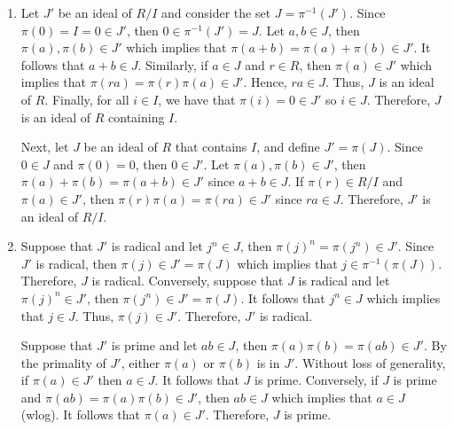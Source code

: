 \begin{solution}
    \begin{enumerate}[label=(\alph*)]
        \item Let $J'$ be an ideal of $R/I$ and consider the set $J = \pi^{-1}(J')$. Since $\pi(0) = I = 0 \in J'$, then $0 \in \pi^{-1}(J') = J$. Let $a,b \in J$, then $\pi(a), \pi(b) \in J'$ which implies that $\pi(a+b) = \pi(a) + \pi(b) \in J'$. It follows that $a+b \in J$. Similarly, if $a \in J$ and $r \in R$, then $\pi(a) \in J'$ which implies that $\pi(ra) = \pi(r)\pi(a) \in J'$. Hence, $ra \in J$. Thus, $J$ is an ideal of $R$. Finally, for all $i \in I$, we have that $\pi(i) = 0 \in J'$ so $i \in J$. Therefore, $J$ is an ideal of $R$ containing $I$.
        
        Next, let $J$ be an ideal of $R$ that contains $I$, and define $J' = \pi(J)$. Since $0 \in J$ and $\pi(0) = 0$, then $0 \in J'$. Let $\pi(a), \pi(b) \in J'$, then $\pi(a) + \pi(b) = \pi(a+b) \in J'$ since $a + b \in J$. If $\pi(r) \in R/I$ and $\pi(a) \in J'$, then $\pi(r)\pi(a) = \pi(ra) \in J'$ since $ra \in J$. Therefore, $J'$ is an ideal of $R/I$.
        \item Suppose that $J'$ is radical and let $j^n \in J$, then $\pi(j)^n = \pi(j^n) \in J'$. Since $J'$ is radical, then $\pi(j) \in J' = \pi(J)$ which implies that $j \in \pi^{-1}(\pi(J))$. Therefore, $J$ is radical. Conversely, suppose that $J$ is radical and let $\pi(j)^n \in J'$, then $\pi(j^n) \in J' = \pi(J)$. It follows that $j^n \in J$ which implies that $j \in J$. Thus, $\pi(j) \in J'$. Therefore, $J'$ is radical.
        
        Suppose that $J'$ is prime and let $ab \in J$, then $\pi(a)\pi(b) = \pi(ab) \in J'$. By the primality of $J'$, either $\pi(a)$ or $\pi(b)$ is in $J'$. Without loss of generality, if $\pi(a) \in J'$ then $a \in J$. It follows that $J$ is prime. Conversely, if $J$ is prime and $\pi(ab) = \pi(a)\pi(b) \in J'$, then $ab \in J$ which implies that $a \in J$ (wlog). It follows that $\pi(a) \in J'$. Therefore, $J$ is prime.
        

\end{enumerate}
\end{solution}
